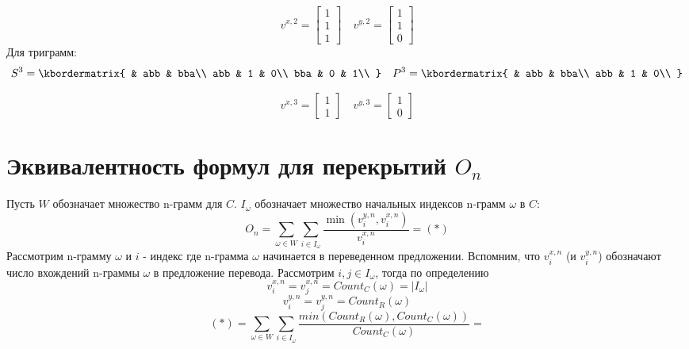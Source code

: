 \documentclass[14pt, a4paper]{extarticle}
\begin{document}
\[
v^{x, 2} = \begin{bmatrix}1 \\ 1 \\ 1\end{bmatrix}
\quad
v^{y, 2} = \begin{bmatrix}1 \\ 1 \\ 0\end{bmatrix}
\]
Для триграмм:
\[
S^3 = \kbordermatrix{
  & abb & bba\\
  abb & 1 & 0\\
  bba & 0 & 1\\
  }
\quad
P^3 = \kbordermatrix{
  & abb & bba\\
  abb & 1 & 0\\
  }
\]

\[
v^{x, 3} = \begin{bmatrix}1 \\ 1\end{bmatrix}
\quad
v^{y, 3} = \begin{bmatrix}1 \\ 0\end{bmatrix}
\]

\section{Эквивалентность формул для перекрытий $O_n$}
\label{app:OO}
Пусть $W$ обозначает множество n-грамм для $C$. $I_{\omega}$ обозначает множество начальных индексов n-грамм $\omega$ в $C$:
$$ O_n = \sum\limits_{\omega \in W} \sum\limits_{i \in I_{\omega}}
\frac{\min(v_i^{y, n}, v_i^{x, n})}{v_i^{x, n}} = (*)$$
Рассмотрим n-грамму $\omega$ и $i$ - индекс где n-грамма $\omega$ начинается в переведенном предложении. Вспомним, что $v_i^{x, n}$ (и $v_i^{y, n}$) обозначают число вхождений n-граммы $\omega$ в предложение перевода.
Рассмотрим $i, j \in I_{\omega}$, тогда по определению $$v_i^{x, n} = v_j^{x, n} = Count_C(\omega) = |I_\omega|$$
$$ v_i^{y, n} = v_j^{y, n} = Count_R(\omega)$$
  $$
(*) =\sum\limits_{\omega \in W} \sum_{i \in I_{\omega}} \frac{min(Count_R(\omega), Count_C(\omega))}{Count_C(\omega)} =
  $$
\end{document}
